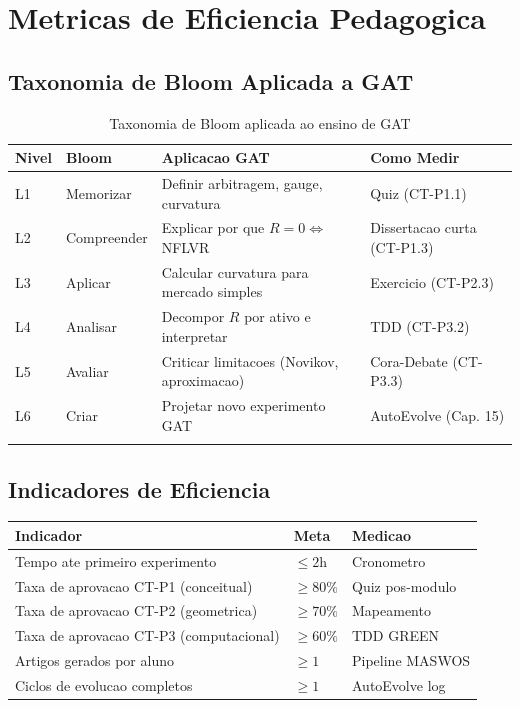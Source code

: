 \section{Metricas de Eficiencia Pedagogica}

\subsection{Taxonomia de Bloom Aplicada a GAT}

\begin{center}
\begin{longtable}{p{}p{}p{}p{}}
\toprule
\textbf{Nivel} & \textbf{Bloom} & \textbf{Aplicacao GAT} & \textbf{Como Medir}\\
\midrule
L1 & Memorizar & Definir arbitragem, gauge, curvatura & Quiz (CT-P1.1) \\
L2 & Compreender & Explicar por que $R=0 \Leftrightarrow$ NFLVR & Dissertacao curta (CT-P1.3) \\
L3 & Aplicar & Calcular curvatura para mercado simples & Exercicio (CT-P2.3) \\
L4 & Analisar & Decompor $R$ por ativo e interpretar & TDD (CT-P3.2) \\
L5 & Avaliar & Criticar limitacoes (Novikov, aproximacao) & Cora-Debate (CT-P3.3) \\
L6 & Criar & Projetar novo experimento GAT & AutoEvolve (Cap. 15) \\
\bottomrule
\caption{Taxonomia de Bloom aplicada ao ensino de GAT}
\label{tab:bloom}
\end{longtable}
\end{center}

\subsection{Indicadores de Eficiencia}

\begin{center}
\begin{tabular}{p{}p{}p{}}
\toprule
\textbf{Indicador} & \textbf{Meta} & \textbf{Medicao} \\
\midrule
Tempo ate primeiro experimento & $\leq 2$h & Cronometro \\
Taxa de aprovacao CT-P1 (conceitual) & $\geq 80\%$ & Quiz pos-modulo \\
Taxa de aprovacao CT-P2 (geometrica) & $\geq 70\%$ & Mapeamento \\
Taxa de aprovacao CT-P3 (computacional) & $\geq 60\%$ & TDD GREEN \\
Artigos gerados por aluno & $\geq 1$ & Pipeline MASWOS \\
Ciclos de evolucao completos & $\geq 1$ & AutoEvolve log \\
\bottomrule
\end{tabular}
\end{center}

